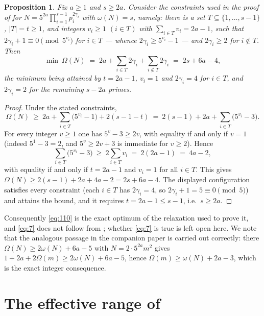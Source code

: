 \documentclass[11pt,a4paper]{article}
\theoremstyle{plain}
\newtheorem{proposition}[theorem]{Proposition}
\theoremstyle{definition}
\begin{document}
\begin{proposition}\label{prop:tight}
Fix $a\ge 1$ and $s\ge 2a$. Consider the constraints used in the proof of
\cite[Theorem 1.10]{CMM10} for $N=5^{2a}\prod_{i=1}^{s-1}p_{i}^{2\gamma_{i}}$ with
$\omega(N)=s$, namely: there is a set $T\subseteq\{1,\dots,s-1\}$, $|T|=t\ge 1$, and
integers $v_{i}\ge 1$ $(i\in T)$ with $\sum_{i\in T}v_{i}=2a-1$, such that
$2\gamma_{i}+1\equiv 0\pmod{5^{v_{i}}}$ for $i\in T$ --- whence
$2\gamma_{i}\ge 5^{v_{i}}-1$ --- and $2\gamma_{i}\ge 2$ for $i\notin T$. Then
\[
  \min\ \Omega(N)\;=\;2a+\sum_{i\in T}2\gamma_{i}+\sum_{i\notin T}2\gamma_{i}
  \;=\;2s+6a-4 ,
\]
the minimum being attained by $t=2a-1$, $v_{i}=1$ and $2\gamma_{i}=4$ for $i\in T$,
and $2\gamma_{i}=2$ for the remaining $s-2a$ primes.
\end{proposition}

\begin{proof}
Under the stated constraints,
\[
  \Omega(N)\ \ge\ 2a+\sum_{i\in T}\bigl(5^{v_{i}}-1\bigr)+2(s-1-t)
  \ =\ 2(s-1)+2a+\sum_{i\in T}\bigl(5^{v_{i}}-3\bigr).
\]
For every integer $v\ge 1$ one has $5^{v}-3\ge 2v$, with equality if and only if
$v=1$ (indeed $5^{1}-3=2$, and $5^{v}\ge 2v+3$ is immediate for $v\ge 2$). Hence
\[
  \sum_{i\in T}\bigl(5^{v_{i}}-3\bigr)\ \ge\ 2\sum_{i\in T}v_{i}\ =\ 2(2a-1)\ =\ 4a-2 ,
\]
with equality if and only if $t=2a-1$ and $v_{i}=1$ for all $i\in T$. This gives
$\Omega(N)\ge 2(s-1)+2a+4a-2=2s+6a-4$. The displayed configuration satisfies every
constraint (each $i\in T$ has $2\gamma_{i}=4$, so $2\gamma_{i}+1=5\equiv 0
\pmod{5}$) and attains the bound, and it requires $t=2a-1\le s-1$, i.e.\ $s\ge 2a$.
\end{proof}

Consequently \eqref{eq:110} is the exact optimum of the relaxation used to prove it,
and \eqref{eq:7} does not follow from \cite[Theorem 1.10]{CMM10}; whether \eqref{eq:7}
is true is left open here. We note that the analogous passage in the companion
paper \cite{CMM20} is carried out correctly: there
$\Omega(N)\ge 2\omega(N)+6a-5$ with $N=2\cdot 5^{2a}m^{2}$ gives
$1+2a+2\Omega(m)\ge 2\omega(N)+6a-5$, hence $\Omega(m)\ge\omega(N)+2a-3$, which is
the exact integer consequence.

\section{The effective range of \cite[Theorem 1.2]{M10}}\label{sec:range}
\end{document}
